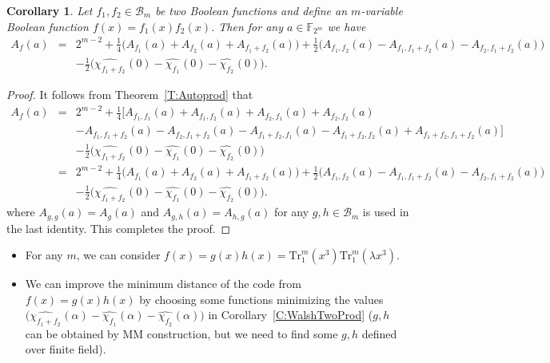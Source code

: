 \documentclass[10pt]{article}
\newtheorem{corollary}{Corollary}
\newcommand{\F}{\mathbb{F}}
\newcommand{\0}{\textbf{0}}
\newcommand{\1}{\textbf{1}}
\newcommand{\Tr}{\mathrm{Tr}_1^m}
\newcommand{\W}[2][]{\widehat{\chi_{#2}}^{#1}}
\begin{document}
{\begin{corollary}\label{C:ATwoProd}
Let $f_1,f_2\in\mathcal{B}_m$ be two Boolean functions and define an $m$-variable Boolean function $f(x)=f_1(x)f_2(x)$.
Then for any ${a}\in\F_{2^m}$ we have
\begin{eqnarray*}
A_f({a})&=& 2^{m-2}+\frac{1}{4}\Big(A_{f_1}({a})+A_{f_2}({a})+A_{f_1+f_2}({a})\Big)+\frac{1}{2}\Big(A_{f_1,f_2}({a})-A_{f_1,f_1+f_2}({a})-A_{f_2,f_1+f_2}({a})\Big)\\
&&-\frac{1}{2}\Big(\W {f_1+f_2}(0)-\W {f_1}(0)-\W {f_2}(0)\Big).
\end{eqnarray*}
\end{corollary}
\begin{proof}
It follows from Theorem~\ref{T:Autoprod} that
\begin{eqnarray*}
A_f({a})&=& 2^{m-2}+\frac{1}{4}\Big[A_{f_1,f_1}({a})+A_{f_1,f_2}({a})+A_{f_2,f_1}({a})+A_{f_2,f_2}({a})\\
&&-A_{f_1,f_1+f_2}({a})-A_{f_2,f_1+f_2}({a})-A_{f_1+f_2,f_1}({a})-A_{f_1+f_2,f_2}({a})+A_{f_1+f_2,f_1+f_2}({a})\Big]\\
&&-\frac{1}{2}\Big(\W {f_1+f_2}(0)-\W {f_1}(0)-\W {f_2}(0)\Big)\\
&=& 2^{m-2}+\frac{1}{4}\Big(A_{f_1}({a})+A_{f_2}({a})+A_{f_1+f_2}({a})\Big)+\frac{1}{2}\Big(A_{f_1,f_2}({a})-A_{f_1,f_1+f_2}({a})-A_{f_2,f_1+f_2}({a})\Big)\\
&&-\frac{1}{2}\Big(\W {f_1+f_2}(0)-\W {f_1}(0)-\W {f_2}(0)\Big).
\end{eqnarray*}
where $A_{g,g}({a})=A_{g}({a})$ and $A_{g,h}({a})=A_{h,g}({a})$ for any $g,h\in\mathcal{B}_m$
is used in the last  identity. This completes the proof.
\end{proof}
}

{\color{red}
\begin{itemize}
  \item For any $m$, we can consider $f(x)=g(x)h(x)=\Tr(x^3)\Tr(\lambda x^3)$.
  \item  We can improve the minimum distance of the code from $f(x)=g(x)h(x)$ by choosing some functions minimizing the values
  $\Big(\W {f_1+f_2}(\alpha)-\W {f_1}(\alpha)-\W {f_2}(\alpha)\Big)$ in Corollary~\ref{C:WalshTwoProd} ($g,h$ can be obtained by MM construction, but
  we need to find some $g,h$ defined over finite field).
\end{itemize}

}
\end{document}
